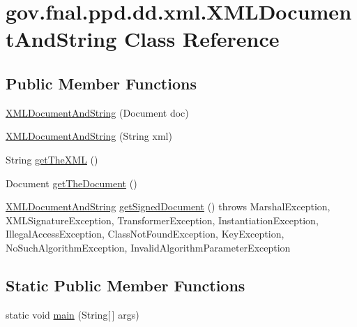\hypertarget{classgov_1_1fnal_1_1ppd_1_1dd_1_1xml_1_1XMLDocumentAndString}{\section{gov.\-fnal.\-ppd.\-dd.\-xml.\-X\-M\-L\-Document\-And\-String Class Reference}
\label{classgov_1_1fnal_1_1ppd_1_1dd_1_1xml_1_1XMLDocumentAndString}
}
\subsection*{Public Member Functions}
\begin{DoxyCompactItemize}
\item 
\hyperlink{classgov_1_1fnal_1_1ppd_1_1dd_1_1xml_1_1XMLDocumentAndString_a785a51fa8313f57b711a6f0234e8282c}{X\-M\-L\-Document\-And\-String} (Document doc)
\item 
\hyperlink{classgov_1_1fnal_1_1ppd_1_1dd_1_1xml_1_1XMLDocumentAndString_acdfa3bc11f59b1dbff8cb5c18e09c143}{X\-M\-L\-Document\-And\-String} (String xml)
\item 
String \hyperlink{classgov_1_1fnal_1_1ppd_1_1dd_1_1xml_1_1XMLDocumentAndString_a81c3dc4d99ae73f079d52008fd963990}{get\-The\-X\-M\-L} ()
\item 
Document \hyperlink{classgov_1_1fnal_1_1ppd_1_1dd_1_1xml_1_1XMLDocumentAndString_aabe02a98c1824eb358467f6378594e2f}{get\-The\-Document} ()
\item 
\hyperlink{classgov_1_1fnal_1_1ppd_1_1dd_1_1xml_1_1XMLDocumentAndString}{X\-M\-L\-Document\-And\-String} \hyperlink{classgov_1_1fnal_1_1ppd_1_1dd_1_1xml_1_1XMLDocumentAndString_ad8066c55eff8ed13617381bea2c98aab}{get\-Signed\-Document} ()  throws Marshal\-Exception, X\-M\-L\-Signature\-Exception, Transformer\-Exception, Instantiation\-Exception, Illegal\-Access\-Exception, 			\-Class\-Not\-Found\-Exception, Key\-Exception, No\-Such\-Algorithm\-Exception, Invalid\-Algorithm\-Parameter\-Exception 
\end{DoxyCompactItemize}
\subsection*{Static Public Member Functions}
\begin{DoxyCompactItemize}
\item 
static void \hyperlink{classgov_1_1fnal_1_1ppd_1_1dd_1_1xml_1_1XMLDocumentAndString_a753ec174577aa0b799a56b8fd1f055e0}{main} (String\mbox{[}$\,$\mbox{]} args)
\end{DoxyCompactItemize}


